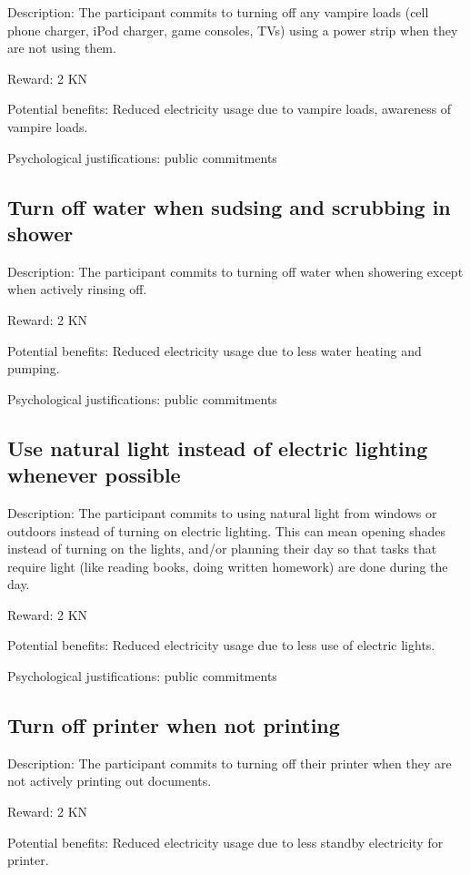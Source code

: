 Description: The participant commits to turning off any vampire loads (cell phone charger, iPod charger, game consoles, TVs) using a power strip when they are not using them.

Reward: 2 KN

Potential benefits: Reduced electricity usage due to vampire loads, awareness of vampire loads.

Psychological justifications: public commitments

\subsection{Turn off water when sudsing and scrubbing in shower}

Description: The participant commits to turning off water when showering except when actively rinsing off.

Reward: 2 KN

Potential benefits: Reduced electricity usage due to less water heating and pumping.

Psychological justifications: public commitments

\subsection{Use natural light instead of electric lighting whenever possible}

Description: The participant commits to using natural light from windows or outdoors instead of turning on electric lighting. This can mean opening shades instead of turning on the lights, and/or planning their day so that tasks that require light (like reading books, doing written homework) are done during the day.

Reward: 2 KN

Potential benefits: Reduced electricity usage due to less use of electric lights.

Psychological justifications: public commitments

\subsection{Turn off printer when not printing}

Description: The participant commits to turning off their printer when they are not actively printing out documents.

Reward: 2 KN

Potential benefits: Reduced electricity usage due to less standby electricity for printer.

